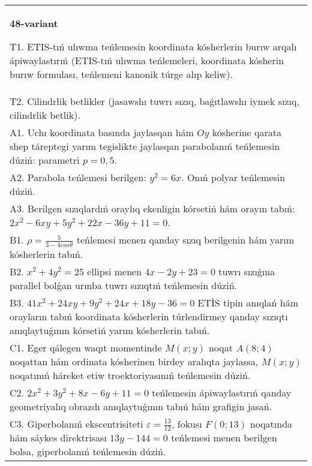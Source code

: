 \documentclass{article}
\begin{document}
\begin{tabular}{m{17cm}}
\textbf{48-variant}
\newline

T1. ETIS-tıń ulıwma teńlemesin koordinata kósherlerin burıw arqalı ápiwaylastırıń (ETIS-tıń ulıwma teńlemeleri, koordinata kósherin burıw formulası, teńlemeni kanonik túrge alıp keliw).\\

T2. Cilindrlik betlikler (jasawshı tuwrı sızıq, baǵıtlawshı iymek sızıq, cilindrlik betlik).\\

A1. Uchı koordinata basında jaylasqan hám $Oy$ kósherine qarata shep táreptegi yarım tegislikte jaylasqan parabolanıń teńlemesin dúziń: parametri $p=0,5$.\\

A2. Parabola teńlemesi berilgen: $y^2=6 x$. Onıń polyar teńlemesin dúziń.\\

A3. Berilgen sızıqlardıń oraylıq ekenligin kórsetiń hám orayın tabıń: $2 x^{2}-6 xy+5 y^{2}+22 x-36 y+11=0$.\\

B1. $\rho = \frac{5}{3 - 4cos\theta}$ teńlemesi menen qanday sızıq berilgenin hám yarım kósherlerin tabıń.  \\

B2. $x^{2} + 4y^{2} = 25$ ellipsi menen $4x - 2y + 23 = 0$ tuwrı sızıǵına parallel bolǵan urınba tuwrı sızıqtıń teńlemesin dúziń.  \\

B3. $41x^{2} + 24xy + 9y^{2} + 24x + 18y - 36 = 0$ ETİS tipin anıqlań hám orayların tabıń koordinata kósherlerin túrlendirmey qanday sızıqtı anıqlaytuǵının kórsetiń yarım kósherlerin tabıń.  \\

C1. Eger qálegen waqıt momentinde $M(x;y)$ noqat $A(8;4)$ noqattan hám ordinata kósherinen birdey aralıqta jaylassa, $M(x;y)$ noqatınıń háreket etiw troektoriyasınıń teńlemesin dúziń.  \\

C2. $2x^{2} + 3y^{2} + 8x - 6y + 11 = 0$ teńlemesin ápiwaylastırıń qanday geometriyalıq obrazdı anıqlaytuǵının tabıń hám grafigin jasań.\\

C3. Giperbolanıń ekscentrisiteti $\varepsilon = \frac{13}{12}$, fokusı $F(0;13)$ noqatında hám sáykes direktrisası $13y - 144 = 0$ teńlemesi menen berilgen bolsa, giperbolanıń teńlemesin dúziń.  \\

\end{tabular}
\vspace{1cm}
\end{document}
